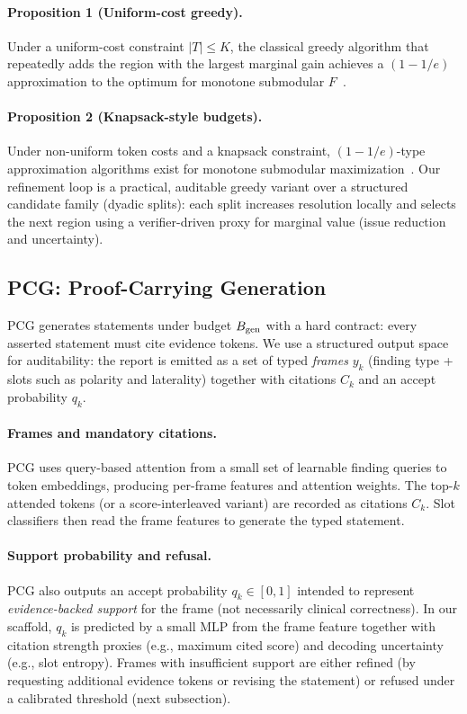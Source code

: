 \paragraph{Proposition 1 (Uniform-cost greedy).}
Under a uniform-cost constraint $|T|\le K$, the classical greedy algorithm that repeatedly adds the region with the largest marginal gain achieves a $(1-1/e)$ approximation to the optimum for monotone submodular $F$~\citep{nemhauser1978analysis}.
\paragraph{Proposition 2 (Knapsack-style budgets).}
Under non-uniform token costs and a knapsack constraint, $(1-1/e)$-type approximation algorithms exist for monotone submodular maximization~\citep{sviridenko2004note}.
Our refinement loop is a practical, auditable greedy variant over a structured candidate family (dyadic splits): each split increases resolution locally and selects the next region using a verifier-driven proxy for marginal value (issue reduction and uncertainty).

\subsection{PCG: Proof-Carrying Generation}
PCG generates statements under budget $B_{\mathrm{gen}}$ with a hard contract: every asserted statement must cite evidence tokens.
We use a structured output space for auditability: the report is emitted as a set of typed \emph{frames} $y_k$ (finding type + slots such as polarity and laterality) together with citations $C_k$ and an accept probability $q_k$.

\paragraph{Frames and mandatory citations.}
PCG uses query-based attention from a small set of learnable finding queries to token embeddings, producing per-frame features and attention weights.
The top-$k$ attended tokens (or a score-interleaved variant) are recorded as citations $C_k$.
Slot classifiers then read the frame features to generate the typed statement.

\paragraph{Support probability and refusal.}
PCG also outputs an accept probability $q_k\in[0,1]$ intended to represent \emph{evidence-backed support} for the frame (not necessarily clinical correctness).
In our scaffold, $q_k$ is predicted by a small MLP from the frame feature together with citation strength proxies (e.g., maximum cited score) and decoding uncertainty (e.g., slot entropy).
Frames with insufficient support are either refined (by requesting additional evidence tokens or revising the statement) or refused under a calibrated threshold (next subsection).


